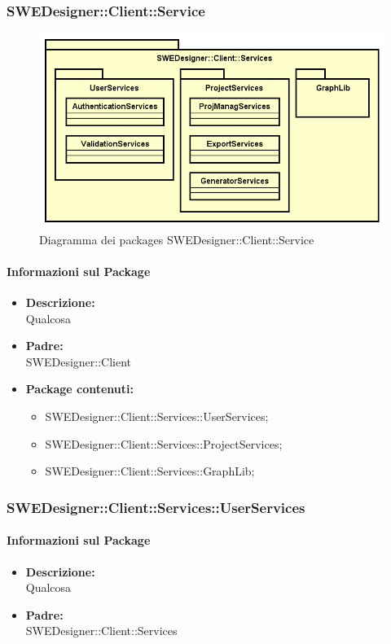 \subsubsection{SWEDesigner::Client::Service}
		 \begin{figure}[h!]
		\centering
		\includegraphics[scale=0.4]{Disegnetti/SWEDesigner__Client__Services.png}
		\caption{Diagramma dei packages SWEDesigner::Client::Service}
 		\end{figure}
		\paragraph{Informazioni sul Package}
		\begin{itemize}
			\item \textbf{Descrizione: }\\
			Qualcosa
			\item \textbf{Padre: }\\ SWEDesigner::Client
			\item \textbf{Package contenuti: }
			\begin{itemize}
				\item SWEDesigner::Client::Services::UserServices;
				\item SWEDesigner::Client::Services::ProjectServices;
				\item SWEDesigner::Client::Services::GraphLib;
			\end{itemize}
		\end{itemize}

	\subsubsection{SWEDesigner::Client::Services::UserServices}
		\paragraph{Informazioni sul Package}
		\begin{itemize}
			\item \textbf{Descrizione: }\\
			Qualcosa
			\item \textbf{Padre: }\\ SWEDesigner::Client::Services
		\end{itemize}

